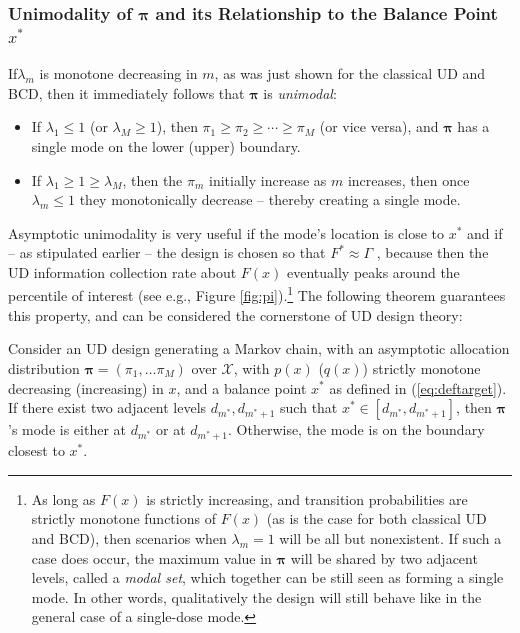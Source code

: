 \subsubsection{Unimodality of $\boldsymbol{\pi}$ and its Relationship to the Balance Point $x^*$}\label{sec:modeloc}

 If$\lambda_m$ is monotone decreasing in $m$, as was just shown for the classical UD and BCD, then it immediately follows that $\boldsymbol{\pi}$ is \emph{unimodal}:

\begin{itemize}
\item  If $\lambda_1\leq 1$ (or $\lambda_M\geq 1$), then $\pi_1\geq\pi_2\geq\cdots\geq\pi_M$ (or vice versa), and $\boldsymbol{\pi}$ has a single mode on the lower (upper) boundary.
\item If $\lambda_1\geq 1\geq\lambda_M$, then the $\pi_m$ initially increase as $m$ increases, then once $\lambda_m\leq 1$ they monotonically decrease -- thereby creating a single mode.
\end{itemize}

Asymptotic unimodality is very useful if the mode's location is close to $x^*$ and if -- as stipulated earlier -- the design is chosen so that $F^*\approx\Gamma$ , because then the UD information collection rate about $F(x)$ eventually peaks around the percentile of interest (see e.g., Figure \ref{fig:pi}).\footnote{As long as $F(x)$ is strictly increasing, and transition probabilities are strictly monotone functions of $F(x)$ (as is the case for both classical UD and BCD), then scenarios when $\lambda_m=1$ will be all but nonexistent. If such a case does occur, the maximum value in $\boldsymbol{\pi}$ will be shared by two adjacent levels, called a \emph{modal set}, which together can be still seen as forming a single mode. In other words, qualitatively the design will still behave like in the general case of a single-dose mode.} The following theorem guarantees this property, and can be considered the cornerstone of UD design theory:

\begin{thm}\label{thm:mode} Consider an UD design generating a Markov chain, with an asymptotic allocation distribution $\boldsymbol{\pi}=\left(\pi_1,\ldots \pi_M\right)$ over $\mathcal{X}$, with $p(x)$ ($q(x)$) strictly monotone decreasing (increasing) in $x$, and a balance point $x^*$ as defined in (\ref{eq:deftarget}). If there exist two adjacent levels $d_{m^*},d_{m^*+1}$ such that $x^*\in\left[d_{m^*},d_{m^*+1}\right]$, then $\boldsymbol{\pi}$'s mode is either at $d_{m^*}$ or at $d_{m^*+1}$. Otherwise, the mode is on the boundary closest to $x^*$.
\end{thm}

